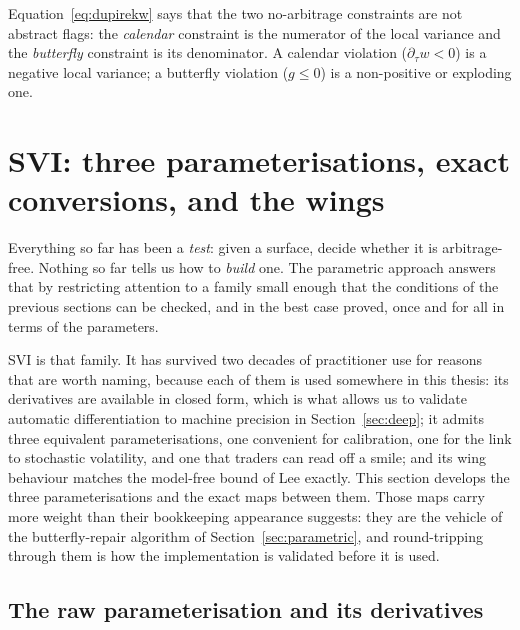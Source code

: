 \begin{remark}\label{rem:organise}
Equation~\eqref{eq:dupirekw} says that the two no-arbitrage constraints are not abstract flags:
the \emph{calendar} constraint is the numerator of the local variance and the \emph{butterfly}
constraint is its denominator. A calendar violation ($\partial_\tau w<0$) is a negative local
variance; a butterfly violation ($g\le 0$) is a non-positive or exploding one.
\end{remark}

\section{SVI: three parameterisations, exact conversions, and the wings}\label{sec:svisec}

Everything so far has been a \emph{test}: given a surface, decide whether it is arbitrage-free.
Nothing so far tells us how to \emph{build} one. The parametric approach answers that by
restricting attention to a family small enough that the conditions of the previous sections can
be checked, and in the best case proved, once and for all in terms of the parameters.

SVI is that family. It has survived two decades of practitioner use for reasons that are worth
naming, because each of them is used somewhere in this thesis: its derivatives are available in
closed form, which is what allows us to validate automatic differentiation to machine precision
in Section~\ref{sec:deep}; it admits three equivalent parameterisations, one convenient for
calibration, one for the link to stochastic volatility, and one that traders can read off a
smile; and its wing behaviour matches the model-free bound of Lee exactly. This section develops
the three parameterisations and the exact maps between them. Those maps carry more weight than
their bookkeeping appearance suggests: they are the vehicle of the butterfly-repair algorithm of
Section~\ref{sec:parametric}, and round-tripping through them is how the implementation is
validated before it is used.

\subsection{The raw parameterisation and its derivatives}

